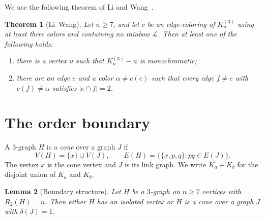 \documentclass[11pt]{amsart}
\newtheorem{theorem}{Theorem}
\newtheorem{lemma}[theorem]{Lemma}
\newcommand{\Lpath}{\mathcal L}
\begin{document}
We use the following theorem of Li and Wang~\cite[Theorem~1.5]{LiWang}.

\begin{theorem}[Li--Wang]\label{thm:LW}
Let $n\ge7$, and let $c$ be an edge-coloring of $K_n^{(3)}$ using at
least three colors and containing no rainbow $\Lpath$. Then at least one
of the following holds:
\begin{enumerate}
\item there is a vertex $u$ such that $K_n^{(3)}-u$ is monochromatic;
\item there are an edge $e$ and a color $\alpha\ne c(e)$ such that every
edge $f\ne e$ with $c(f)\ne\alpha$ satisfies $|e\cap f|=2$.
\end{enumerate}
\end{theorem}

\section{The order boundary}

A $3$-graph $H$ is a \emph{cone} over a graph $J$ if
\[
  V(H)=\{x\}\cup V(J),
  \qquad
  E(H)=\bigl\{\{x,p,q\}:pq\in E(J)\bigr\}.
\]
The vertex $x$ is the cone vertex and $J$ is its link graph. We write
$K_a+K_b$ for the disjoint union of $K_a$ and $K_b$.

\begin{lemma}[Boundary structure]\label{lem:boundary}
Let $H$ be a $3$-graph on $n\ge7$ vertices with $R_2(H)=n$. Then either
$H$ has an isolated vertex or $H$ is a cone over a graph $J$ with
$\delta(J)=1$.
\end{lemma}
\end{document}
